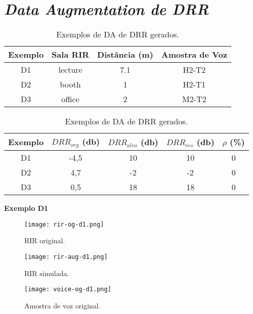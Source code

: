 \section{\textit{Data Augmentation de DRR}}

\begin{table} [H]
    \centering
    \caption{Exemplos de DA de DRR gerados.}
    \label{tbl-a:da-drr}
    \begin{tabular}{c|c|c|c}

        \textbf{Exemplo} & 
        \textbf{Sala RIR} & 
        \textbf{Distância (m)} &
        \textbf{Amostra de Voz} \\
        \hline 

        D1 & lecture & 7.1 & H2-T2 \\
        D2 & booth & 1 & H2-T1 \\
        D3 & office & 2 & M2-T2 \\

    \end{tabular}
    \bigbreak
    \bigbreak
    \begin{tabular}{c|c|c|c|c}

        \textbf{Exemplo} & 
        \textbf{$DRR_{org}$ (db)} & 
        \textbf{$DRR_{alvo}$ (db)} &
        \textbf{$DRR_{res}$ (db)} & 
        \textbf{$\rho$ (\%)} \\
        \hline 

        D1 & -4,5 & 10 & 10 & 0 \\
        D2 & 4,7 & -2 & -2 & 0 \\
        D3 & 0,5 & 18 & 18 & 0 \\

    \end{tabular}
\end{table}

\pagebreak
{\Large \textbf{Exemplo D1}}

\begin{figure} [H]
    \centering
    \texttt{[image: rir-og-d1.png]}
    \caption{RIR original.}
    \label{fig-a:rir-og-d1}
\end{figure} 

\begin{figure} [H]
    \centering
    \texttt{[image: rir-aug-d1.png]}
    \caption{RIR simulada.}
    \label{fig-a:rir-aug-d1}
\end{figure} 

\begin{figure} [H]
    \centering
    \texttt{[image: voice-og-d1.png]}
    \caption{Amostra de voz original.}
    \label{fig-a:voice-og-d1}
\end{figure} 


